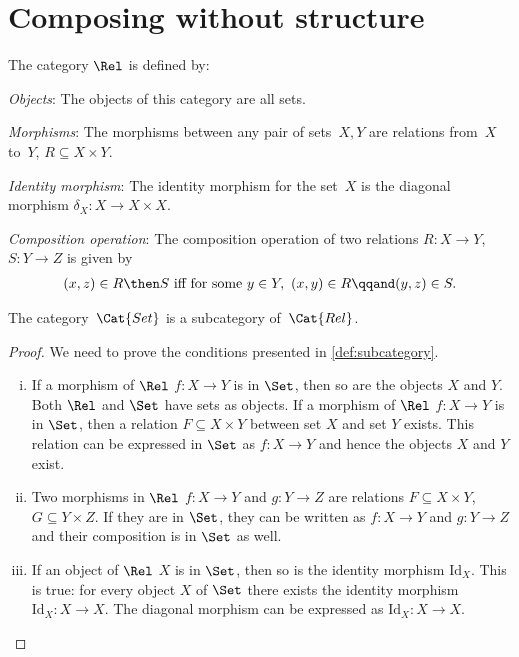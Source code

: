 \section{Composing without structure}
\begin{definition}
    The category $\Rel$ is defined by:
    \begin{compactenum}
    \item \emph{Objects}: The objects of this category are all sets.
    \item \emph{Morphisms}: The morphisms between any pair of sets~$X, Y$
    are relations from~$X$ to~$Y$, $R\subseteq X\times Y$.
    \item \emph{Identity morphism}: The identity morphism for the set~$X$
    is the diagonal morphism $\delta_X \colon X\to X\times X$.
    \item \emph{Composition operation}: The composition operation of two relations $R \colon X\to Y$, $S\colon Y\to Z$ is given by
    \begin{align}
    (x,z) \in R \then S \text{ iff for some } y \in Y, \ (x,y) \in R \qqand (y,z) \in S.  	
    \end{align}
    \end{compactenum}
\end{definition}

\begin{lemma}
    The category~$\Cat{Set}$ is a subcategory of~$\Cat{Rel}$.
\end{lemma}
\begin{proof}
	We need to prove the conditions presented in \cref{def:subcategory}.
	\begin{enumerate}[(i)]
	\item If a morphism of $\Rel$ $f \colon X\to Y$ is in $\Set$, then so are the objects $X$ and $Y$. Both $\Rel$ and $\Set$ have sets as objects. If a morphism of $\Rel$ $f\colon X\to Y$ is in $\Set$, then a relation $F\subseteq X\times Y$ between set $X$ and set $Y$ exists. This relation can be expressed in $\Set$ as $f\colon X\to Y$ and hence the objects $X$ and $Y$ exist.
	\item Two morphisms in $\Rel$ $f\colon X\to Y$ and $g\colon Y\to Z$ are relations $F\subseteq X\times Y$, $G\subseteq Y\times Z$. If they are in $\Set$, they can be written as $f\colon X\to Y$ and $g\colon Y\to Z$ and their composition is in $\Set$ as well. 
	\item If an object of $\Rel$ $X$ is in $\Set$, then so is the identity morphism $\text{Id}_X$. This is true: for every object $X$ of $\Set$ there exists the identity morphism $\text{Id}_X:X\to X$. The diagonal morphism can be expressed as $\text{Id}_X:X\to X$.
	\end{enumerate}
\end{proof}
